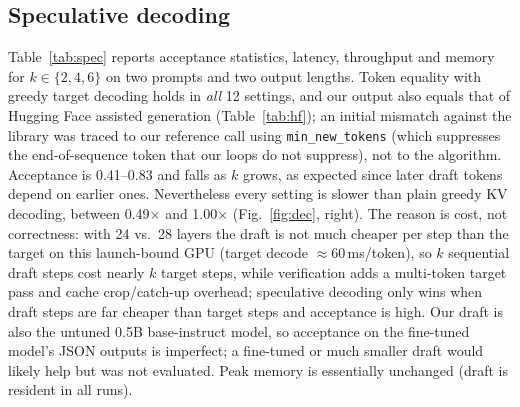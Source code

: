 \documentclass[conference]{IEEEtran}
\begin{document}
\subsection{Speculative decoding}
Table~\ref{tab:spec} reports acceptance statistics, latency, throughput and memory for $k\in\{2,4,6\}$ on two prompts and two output lengths. Token equality with greedy target decoding holds in \emph{all} 12 settings, and our output also equals that of Hugging Face assisted generation (Table~\ref{tab:hf}); an initial mismatch against the library was traced to our reference call using \texttt{min\_new\_tokens} (which suppresses the end-of-sequence token that our loops do not suppress), not to the algorithm. Acceptance is 0.41--0.83 and falls as $k$ grows, as expected since later draft tokens depend on earlier ones. Nevertheless every setting is slower than plain greedy KV decoding, between 0.49$\times$ and 1.00$\times$ (Fig.~\ref{fig:dec}, right). The reason is cost, not correctness: with 24 vs.\ 28 layers the draft is not much cheaper per step than the target on this launch-bound GPU (target decode $\approx$60\,ms/token), so $k$ sequential draft steps cost nearly $k$ target steps, while verification adds a multi-token target pass and cache crop/catch-up overhead; speculative decoding only wins when draft steps are far cheaper than target steps and acceptance is high. Our draft is also the untuned 0.5B base-instruct model, so acceptance on the fine-tuned model's JSON outputs is imperfect; a fine-tuned or much smaller draft would likely help but was not evaluated. Peak memory is essentially unchanged (draft is resident in all runs).


\end{document}
